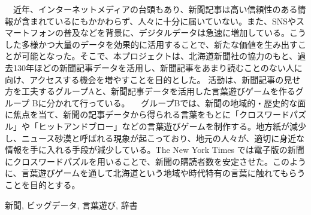 \documentclass[openany, 11pt,papersize,dvipdfm]{jsbook}
\begin{document}
%
\maketitle

\frontmatter

\begin{jabstract}
　近年、インターネットメディアの台頭もあり、新聞記事は高い信頼性のある情報が含まれているにもかかわらず、人々に十分に届いていない。また、SNSやスマートフォンの普及などを背景に、デジタルデータは急速に増加している。こうした多様かつ大量のデータを効果的に活用することで、新たな価値を生み出すことが可能となった。そこで、本プロジェクトは、北海道新聞社の協力のもと、過去130年ほどの新聞記事データを活用し、新聞記事をあまり読むことのない人に向け、アクセスする機会を増やすことを目的とした。
活動は、新聞記事の見せ方を工夫するグループAと、新聞記事データを活用した言葉遊びゲームを作るグループ Bに分かれて行っている。
　グループBでは、新聞の地域的・歴史的な面に焦点を当て、新聞の記事データから得られる言葉をもとに「クロスワードパズル」や「ヒットアンドブロー」などの言葉遊びゲームを制作する。地方紙が減少し、ニュース砂漠と呼ばれる現象が起こっており、地元の人々が、適切に身近な情報を手に入れる手段が減少している。The New York Times では電子版の新聞にクロスワードパズルを用いることで、新聞の購読者数を安定させた。このように、言葉遊びゲームを通して北海道という地域や時代特有の言葉に触れてもらうことを目的とする。
\begin{jkeyword}
新聞, ビッグデータ, 言葉遊び, 辞書
\end{jkeyword}
\end{jabstract}
\end{document}
